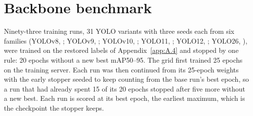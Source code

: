 \documentclass[journal,onecolumn]{IEEEtran}
\begin{document}
\section{Backbone benchmark}\label{app:H}
Ninety-three training runs, 31 YOLO variants with three seeds each from six families (YOLOv8, \cite{jocher2023ultralytics}; YOLOv9, \cite{wang2024yolov9}; YOLOv10, \cite{wang2024yolov10}; YOLO11, \cite{jocher2024ultralytics}; YOLO12, \cite{tian2025yolov12}; YOLO26, \cite{jocher2026ultralytics}), were trained on the restored labels of Appendix~\ref{app:A.4} and stopped by one rule: 20 epochs without a new best mAP50--95. The grid first trained 25 epochs on the training server. Each run was then continued from its 25-epoch weights with the early stopper seeded to keep counting from the base run's best epoch, so a run that had already spent 15 of its 20 epochs stopped after five more without a new best. Each run is scored at its best epoch, the earliest maximum, which is the checkpoint the stopper keeps.
\end{document}
